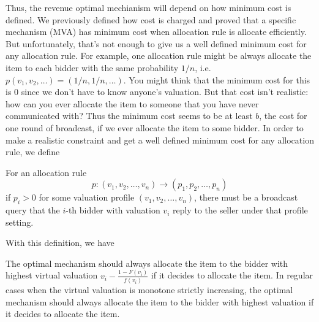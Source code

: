 Thus, the revenue optimal mechianism will depend on how minimum cost is defined. 
We previously defined how cost is charged and proved that a specific mechanism (MVA)
has minimum cost when allocation rule is allocate efficiently. But unfortunately,
that's not enough to give us a well defined minimum cost for any allocation rule.
For example, one allocation rule might be always allocate the item to each bidder
with the same probability $1/n$, i.e. $p(v_1, v_2, \ldots) = (1/n, 1/n, \ldots)$.
You might think that the minimum cost for this is $0$ since we don't have to know
anyone's valuation. But that cost isn't realistic: how can you ever allocate the
item to someone that you have never communicated with? Thus the minimum cost seems
to be at least $b$, the cost for one round of broadcast, if we ever allocate the item
to some bidder. In order to make a realistic constraint and get a well defined minimum
cost for any allocation rule, we define

\begin{definition}\label{def:allocation_cost}
For an allocation rule $$p: (v_1, v_2, \ldots, v_n) \rightarrow (p_1, p_2,
\ldots, p_n)$$ if $p_i > 0$ for some valuation profile $(v_1, v_2, \ldots,
v_n)$, there must be a broadcast query that the $i$-th bidder with valuation
$v_i$ reply to the seller under that profile setting.
\end{definition}

With this definition, we have

\begin{theorem}
The optimal mechanism should always allocate the item to the bidder with
highest virtual valuation $v_i - \frac{1-F(v_i)}{f(v_i)}$ if it decides to
allocate the item. In regular cases when the virtual valuation is monotone
strictly increasing, the optimal mechanism should always allocate the item to
the bidder with highest valuation if it decides to allocate the item.
\end{theorem}

